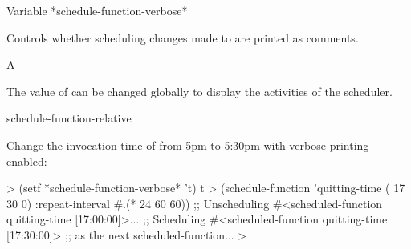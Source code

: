 \documentclass[10pt,twoside,english,pdftex]{article}
\begin{document}
\begin{functiondoc}{Variable}%
  {*schedule-function-verbose*}{}%

\fnsyntax

\fnpurpose Controls whether scheduling changes made to
 are printed as comments. 

\fnpackage {}

\fnmodule {}

\fnvaluetype A 

\fninitialvalue \nil

\fndescription The value of  can be
changed globally to display the activities of the 
scheduler.

\begin{alsos}{schedule-function-relative}
\end{alsos}

%
\fnexample Change the invocation time of 
 from 5pm to 5:30pm with verbose printing enabled:
%
\W\supp
\begin{example}
  > (setf *schedule-function-verbose* 't)
  t
  > (schedule-function 'quitting-time ( 17 30 0)
      :repeat-interval #.(* 24 60 60))
  ;; Unscheduling #<scheduled-function quitting-time [17:00:00]>...
  ;; Scheduling #<scheduled-function quitting-time [17:30:00]> 
  ;; as the next scheduled-function...
  >
\end{example}

\end{functiondoc}

\end{document}
